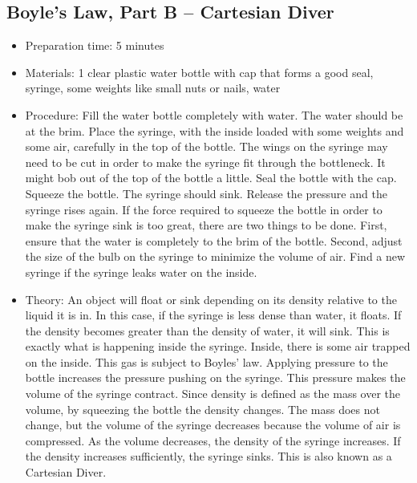 \subsection{Boyle’s Law, Part B – Cartesian Diver}
\begin{itemize}
\item{Preparation time: 5 minutes}
\item{Materials: 1 clear plastic water bottle with cap that forms a good seal, syringe, some weights like small nuts or nails, water}
\item{Procedure: Fill the water bottle completely with water. The water should be at the brim. Place the syringe, with the inside loaded with some weights and some air, carefully in the top of the bottle. The wings on the syringe may need to be cut in order to make the syringe fit through the bottleneck. It might bob out of the top of the bottle a little. Seal the bottle with the cap. Squeeze the bottle. The syringe should sink. Release the pressure and the syringe rises again. If the force required to squeeze the bottle in order to make the syringe sink is too great, there are two things to be done. First, ensure that the water is completely to the brim of the bottle. Second, adjust the size of the bulb on the syringe to minimize the volume of air. Find a new syringe if the syringe leaks water on the inside.}
\item{Theory: An object will float or sink depending on its density relative to the liquid it is in. In this case, if the syringe is less dense than water, it floats. If the density becomes greater than the density of water, it will sink. This is exactly what is happening inside the syringe. Inside, there is some air trapped on the inside. This gas is subject to Boyles’ law. Applying pressure to the bottle increases the pressure pushing on the syringe. This pressure makes the volume of the syringe contract. Since density is defined as the mass over the volume, by squeezing the bottle the density changes. The mass does not change, but the volume of the syringe decreases because the volume of air is compressed. As the volume decreases, the density of the syringe increases. If the density increases sufficiently, the syringe sinks. This is also known as a Cartesian Diver.}
\end{itemize}

